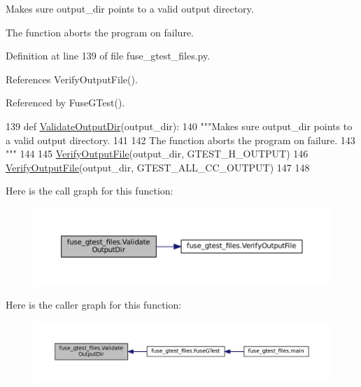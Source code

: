 \begin{DoxyVerb}Makes sure output_dir points to a valid output directory.

The function aborts the program on failure.
\end{DoxyVerb}
 

Definition at line 139 of file fuse\+\_\+gtest\+\_\+files.\+py.



References Verify\+Output\+File().



Referenced by Fuse\+G\+Test().


\begin{DoxyCode}
139 \textcolor{keyword}{def }\hyperlink{namespacefuse__gtest__files_a9f584226b1f996ffff820e0751dbd458}{ValidateOutputDir}(output\_dir):
140   \textcolor{stringliteral}{"""Makes sure output\_dir points to a valid output directory.}
141 \textcolor{stringliteral}{}
142 \textcolor{stringliteral}{  The function aborts the program on failure.}
143 \textcolor{stringliteral}{  """}
144 
145   \hyperlink{namespacefuse__gtest__files_ac3cc183b2fc035aff5b7bc07979b486d}{VerifyOutputFile}(output\_dir, GTEST\_H\_OUTPUT)
146   \hyperlink{namespacefuse__gtest__files_ac3cc183b2fc035aff5b7bc07979b486d}{VerifyOutputFile}(output\_dir, GTEST\_ALL\_CC\_OUTPUT)
147 
148 
\end{DoxyCode}
Here is the call graph for this function\+:
\nopagebreak
\begin{figure}[H]
\begin{center}
\leavevmode
\includegraphics[width=350pt]{namespacefuse__gtest__files_a9f584226b1f996ffff820e0751dbd458_cgraph}
\end{center}
\end{figure}
Here is the caller graph for this function\+:
\nopagebreak
\begin{figure}[H]
\begin{center}
\leavevmode
\includegraphics[width=350pt]{namespacefuse__gtest__files_a9f584226b1f996ffff820e0751dbd458_icgraph}
\end{center}
\end{figure}
\mbox{\label{namespacefuse__gtest__files_a333eb5237899fe2f80b0c624ddba363d}} 
